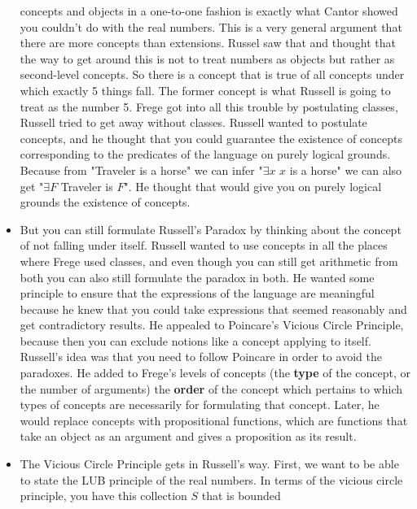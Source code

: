 \documentclass[12pt]{article}
\theoremstyle{definition}
\begin{document}
\begin{itemize}
        concepts and objects in a one-to-one fashion is exactly what Cantor
        showed you couldn't do with the real numbers. This is a very general
        argument that there are more concepts than extensions. Russel saw that
        and thought that the way to get around this is not to treat numbers as
        objects but rather as second-level concepts. So there is a concept that
        is true of all concepts under which exactly 5 things fall. The former
        concept is what Russell is going to treat as the number 5. Frege got
        into all this trouble by postulating classes, Russell tried to get away
        without classes. Russell wanted to postulate concepts, and he thought
        that you could guarantee the existence of concepts corresponding to the
        predicates of the language on purely logical grounds. Because from
        "Traveler is a horse" we can infer "$\exists x$ $x$ is a horse" we can
        also get "$\exists F$ Traveler is $F$". He thought that would give you
        on purely logical grounds the existence of concepts.
    \item
        But you can still formulate Russell's Paradox by thinking about the
        concept of not falling under itself. Russell wanted to use concepts in
        all the places where Frege used classes, and even though you can still
        get arithmetic from both you can also still formulate the paradox in
        both. He wanted some principle to ensure that the expressions of the
        language are meaningful because he knew that you could take expressions
        that seemed reasonably and get contradictory results. He appealed to
        Poincare's Vicious Circle Principle, because then you can exclude
        notions like a concept applying to itself. Russell's idea was that you
        need to follow Poincare in order to avoid the paradoxes. He added to
        Frege's levels of concepts (the \textbf{type} of the concept, or the
        number of arguments) the \textbf{order} of the concept which pertains
        to which types of concepts are necessarily for formulating that
        concept. Later, he would replace concepts with propositional functions,
        which are functions that take an object as an argument and gives a
        proposition as its result.
    \item
        The Vicious Circle Principle gets in Russell's way. First, we want to
        be able to state the LUB principle of the real numbers. In terms of the
        vicious circle principle, you have this collection $S$ that is bounded

\end{itemize}
\end{document}
